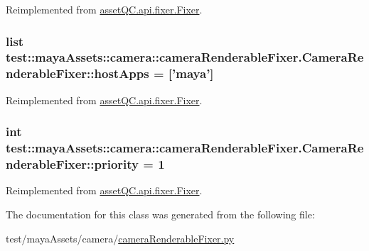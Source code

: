 \-Reimplemented from \hyperlink{classassetQC_1_1api_1_1fixer_1_1Fixer_a79bfa5d846823a25a68ae323f63bb957}{asset\-Q\-C.\-api.\-fixer.\-Fixer}.

\hypertarget{classtest_1_1mayaAssets_1_1camera_1_1cameraRenderableFixer_1_1CameraRenderableFixer_ac17b1274830e822daefcab2a78fd6c0c}{
\subsubsection[{host\-Apps}]{\setlength{\rightskip}{0pt plus 5cm}list {\bf test\-::maya\-Assets\-::camera\-::camera\-Renderable\-Fixer.\-Camera\-Renderable\-Fixer\-::host\-Apps} = \mbox{[}'maya'\mbox{]}}}\label{d0/d94/classtest_1_1mayaAssets_1_1camera_1_1cameraRenderableFixer_1_1CameraRenderableFixer_ac17b1274830e822daefcab2a78fd6c0c}


\-Reimplemented from \hyperlink{classassetQC_1_1api_1_1fixer_1_1Fixer_a60a0a99566e6a8b850a323e275d03fd2}{asset\-Q\-C.\-api.\-fixer.\-Fixer}.

\hypertarget{classtest_1_1mayaAssets_1_1camera_1_1cameraRenderableFixer_1_1CameraRenderableFixer_a0f98813546ea33efea007da514b86cca}{
\subsubsection[{priority}]{\setlength{\rightskip}{0pt plus 5cm}int {\bf test\-::maya\-Assets\-::camera\-::camera\-Renderable\-Fixer.\-Camera\-Renderable\-Fixer\-::priority} = 1}}\label{d0/d94/classtest_1_1mayaAssets_1_1camera_1_1cameraRenderableFixer_1_1CameraRenderableFixer_a0f98813546ea33efea007da514b86cca}


\-Reimplemented from \hyperlink{classassetQC_1_1api_1_1fixer_1_1Fixer_aa5abf1095031f0c0937a3249e1f3dcb1}{asset\-Q\-C.\-api.\-fixer.\-Fixer}.



\-The documentation for this class was generated from the following file\-:\begin{DoxyCompactItemize}
\item 
test/maya\-Assets/camera/\hyperlink{cameraRenderableFixer_8py}{camera\-Renderable\-Fixer.\-py}\end{DoxyCompactItemize}
